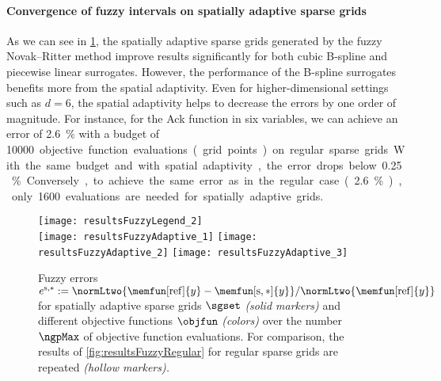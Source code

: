 \begin{algorithm}
  \caption[Fuzzy Novak--Ritter method]{%
    Fuzzy Novak--Ritter method to generate spatially adaptive sparse grids
    for the fuzzy extension principle.
    Inputs are
    the objective function $\objfun$,
    the adaptivity parameter $\gamma \in \clint{0, 1}$,
    the number of $\alpha$ segments,
    the initial sparse grid $\liset$ as a set of level-index pairs, and the
    the $d$ fuzzy intervals $\fuzzy{x}_1, \dotsc, \fuzzy{x}_d$.
    Output is the spatially adaptive sparse grid $\liset$.%
  }%
  \label{alg:fuzzyNovakRitterMethod}%
\end{algorithm}

\paragraph{Convergence of fuzzy intervals on spatially adaptive sparse grids}

As we can see in \cref{fig:resultsFuzzyAdaptive},
the spatially adaptive sparse grids generated by the fuzzy Novak--Ritter
method improve results significantly
for both cubic B-spline and piecewise linear surrogates.
However, the performance of the B-spline surrogates benefits more
from the spatial adaptivity.
Even for higher-dimensional settings such as $d = 6$,
the spatial adaptivity helps to decrease the errors by one order of magnitude.
For instance, for the Ack function in six variables,
we can achieve an error of \SI{2.6}{\percent}
with a budget of \SI{10000} objective function evaluations (grid points)
on regular sparse grids.
With the same budget and with spatial adaptivity, the error drops below
\SI{0.25}{\percent}.
Conversely, to achieve the same error as in the regular case
(\SI{2.6}{\percent}),
only \SI{1600} evaluations are needed for spatially adaptive grids.

\begin{figure}
  \texttt{[image: resultsFuzzyLegend\_2]}\\[2mm]%
  \texttt{[image: resultsFuzzyAdaptive\_1]}%
  \hfill%
  \texttt{[image: resultsFuzzyAdaptive\_2]}%
  \hfill%
  \texttt{[image: resultsFuzzyAdaptive\_3]}%
  \caption[Fuzzy errors for spatially adaptive sparse grids]{%
    Fuzzy errors
    $e^{\sparse,\ast}
    := \normLtwo{\memfun[\reference]{y} - \memfun[\sparse,\ast]{y}}/
    \normLtwo{\memfun[\reference]{y}}$
    for spatially adaptive sparse grids $\sgset$ \emph{(solid markers)}
    and different objective functions $\objfun$ \emph{(colors)}
    over the number $\ngpMax$ of objective function evaluations.
    For comparison, the results of \cref{fig:resultsFuzzyRegular}
    for regular sparse grids are repeated \emph{(hollow markers).}%
  }%
  \label{fig:resultsFuzzyAdaptive}%
\end{figure}
